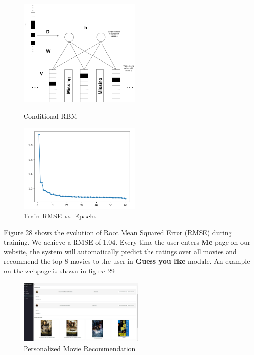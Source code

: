 \begin{CJK*}{UTF8}{gbsn}
\begin{figure}[htbp]
\centering
\label{RBM}
\begin{minipage}[t]{0.45\textwidth}
\centering
\includegraphics[width=6cm]{conditionalRBM.png}
\caption{Conditional RBM}
\end{minipage}
\begin{minipage}[t]{0.45\textwidth}
\centering
\includegraphics[width=6cm]{RBMResult.png}
\caption{Train RMSE vs. Epochs}
\end{minipage}
\end{figure}

\hyperref[RBM]{Figure 28} shows the evolution of Root Mean Squared Error (RMSE) during training. We achieve a RMSE of 1.04. Every time the user enters \textbf{Me} page on our website, the system will automatically predict the ratings over all movies and recommend the top 8 movies to the user in \textbf{Guess you like} module. An example on the webpage is shown in \hyperref[recommend]{figure 29}.

\begin{figure}[h]
    \centering
    \label{recommend}
    \includegraphics[width = 0.55\textwidth]{recommendation.png}
    \caption{Personalized Movie Recommendation}
\end{figure}


\end{CJK*}
